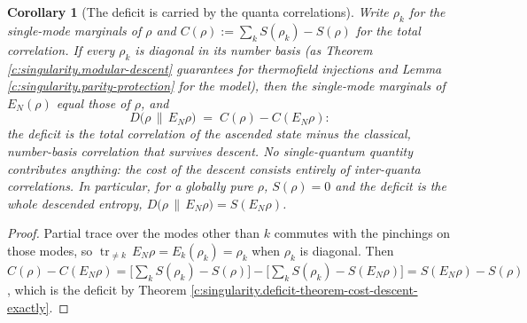 \documentclass[11pt]{article}
\newtheorem{corollary}[theorem]{Corollary}
\theoremstyle{definition}
\theoremstyle{plain}
\providecommand{\EN}{}\renewcommand{\EN}{E_{N}}
\providecommand{\tr}{}\renewcommand{\tr}{\operatorname{tr}}
\providecommand{\rel}{}\renewcommand{\rel}[2]{D\bigl(#1 \,\|\, #2\bigr)}
\begin{document}
\begin{corollary}[The deficit is carried by the quanta correlations]\label{c:singularity.deficit-carried-quanta-correlations}
Write $\rho_k$ for the single-mode marginals of $\rho$ and $C(\rho) := \sum_k S(\rho_k) - S(\rho)$ for the total correlation. If every $\rho_k$ is diagonal in its number basis (as Theorem \ref{c:singularity.modular-descent} guarantees for thermofield injections and Lemma \ref{c:singularity.parity-protection} for the model), then the single-mode marginals of $\EN(\rho)$ equal those of $\rho$, and
\[
\rel{\rho}{\EN\rho} \;=\; C(\rho) - C(\EN\rho) :
\]
the deficit is the total correlation of the ascended state minus the classical, number-basis correlation that survives descent. No single-quantum quantity contributes anything: the cost of the descent consists entirely of inter-quanta correlations. In particular, for a globally pure $\rho$, $S(\rho) = 0$ and the deficit is the whole descended entropy, $\rel{\rho}{\EN\rho} = S(\EN\rho)$.
\end{corollary}
\begin{proof}
Partial trace over the modes other than $k$ commutes with the pinchings on those modes, so $\tr_{\neq k}\,\EN\rho = E_k(\rho_k) = \rho_k$ when $\rho_k$ is diagonal. Then $C(\rho) - C(\EN\rho) = \bigl[\sum_k S(\rho_k) - S(\rho)\bigr] - \bigl[\sum_k S(\rho_k) - S(\EN\rho)\bigr] = S(\EN\rho) - S(\rho)$, which is the deficit by Theorem \ref{c:singularity.deficit-theorem-cost-descent-exactly}.

\end{proof}
\end{document}
